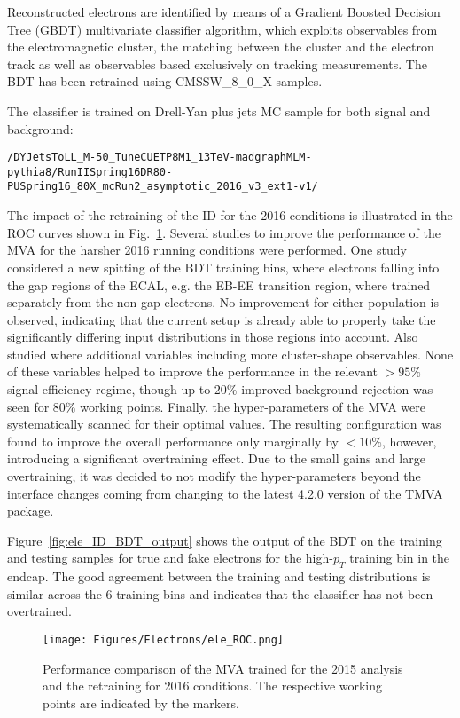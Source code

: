 Reconstructed electrons are identified by means of a Gradient Boosted Decision Tree (GBDT) multivariate classifier algorithm, which exploits observables from the electromagnetic cluster, the matching between the cluster and the electron track as well as observables based exclusively on tracking measurements. 
The BDT has been retrained using CMSSW\_8\_0\_X samples.

The classifier is trained on  Drell-Yan plus jets MC sample for both signal and background: 
{
\tiny  
\begin{verbatim}
/DYJetsToLL_M-50_TuneCUETP8M1_13TeV-madgraphMLM-pythia8/RunIISpring16DR80-PUSpring16_80X_mcRun2_asymptotic_2016_v3_ext1-v1/
\end{verbatim}
}

The impact of the retraining of the ID for the 2016 conditions is illustrated in the ROC curves shown in Fig.~\ref{fig:ele_ID_ROC}. Several studies to improve the performance of the MVA for the harsher 2016 running conditions were performed. 
One study considered a new spitting of the BDT training bins, where electrons falling into the gap regions of the ECAL, e.g. the EB-EE transition region, where trained separately from the non-gap electrons. 
No improvement for either population is observed, indicating that the current setup is already able to properly take the significantly differing input distributions in those regions into account. 
Also studied where additional variables including more cluster-shape observables. 
None of these variables helped to improve the performance in the relevant $>95\%$ signal efficiency regime, though up to $20\%$ improved background rejection was seen for $80\%$ working points. 
Finally, the hyper-parameters of the MVA were systematically scanned for their optimal values. The resulting configuration was found to improve the overall performance only marginally by $<10\%$, however, introducing a significant overtraining effect. 
Due to the small gains and large overtraining, it was decided to not modify the hyper-parameters beyond the interface changes coming from changing to the latest 4.2.0 version of the TMVA package.

Figure~\ref{fig:ele_ID_BDT_output} shows the output of the BDT on the training and testing samples for true and fake electrons 
for the high-$p_T$ training bin in the endcap. 
The good agreement between the training and testing distributions is similar across the 6 training bins and indicates that the classifier has not been overtrained.

\begin{figure}[!htb]
\vspace*{0.3cm}
\begin{center}
\texttt{[image: Figures/Electrons/ele\_ROC.png]}
\caption{Performance comparison of the MVA trained for the 2015 analysis and the retraining for 2016 conditions. 
The respective working points are indicated by the markers.
\label{fig:ele_ID_ROC}}
\end{center}
\end{figure}

